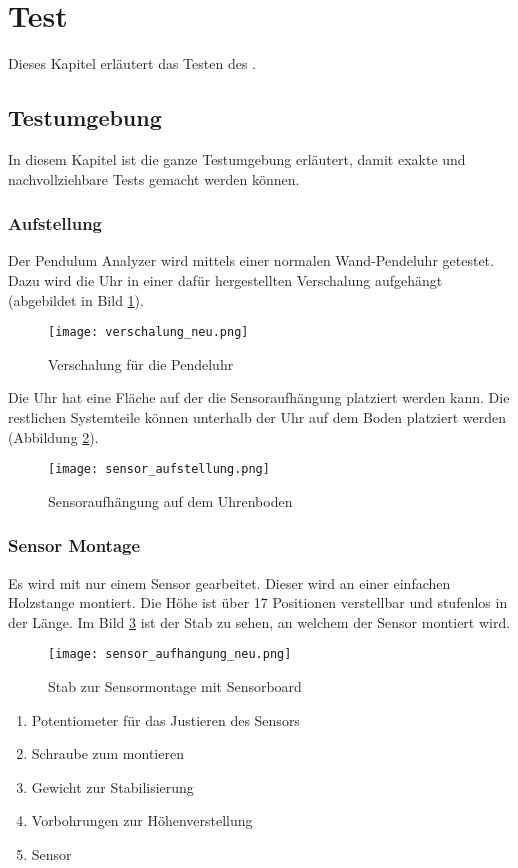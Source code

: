 \section{Test}
Dieses Kapitel erläutert das Testen des \documenttitle.
	\subsection{Testumgebung}
    In diesem Kapitel ist die ganze Testumgebung erläutert, damit exakte und nachvollziehbare Tests gemacht werden können.
    \subsubsection{Aufstellung}
    Der Pendulum Analyzer wird mittels einer normalen Wand-Pendeluhr getestet. Dazu wird die Uhr in einer dafür hergestellten Verschalung aufgehängt (abgebildet in Bild \ref{fig:verschalung}).
    \begin{figure}[H]
        \centering
        \texttt{[image: verschalung\_neu.png]}
        \caption{Verschalung für die Pendeluhr}
        \label{fig:verschalung}
    \end{figure}

    \noindent Die Uhr hat eine Fläche auf der die Sensoraufhängung platziert werden kann.
    Die restlichen Systemteile können unterhalb der Uhr auf dem Boden platziert werden (Abbildung \ref{fig:uhrboden}).
    \begin{figure}[h]
        \centering
        \texttt{[image: sensor\_aufstellung.png]}
        \caption{Sensoraufhängung auf dem Uhrenboden}
        \label{fig:uhrboden}
    \end{figure}
    
    \clearpage
    \subsubsection{Sensor Montage}
    Es wird mit nur einem Sensor gearbeitet.
    Dieser wird an einer einfachen Holzstange montiert.
    Die Höhe ist über 17 Positionen verstellbar und stufenlos in der Länge. Im Bild \ref{fig:sensor_montage} ist der Stab zu sehen, an welchem der Sensor montiert wird.
    \begin{figure}[H]
        \centering
        \texttt{[image: sensor\_aufhangung\_neu.png]}
        \caption{Stab zur Sensormontage mit Sensorboard}
        \label{fig:sensor_montage}
    \end{figure}
    \begin{enumerate}
        \item Potentiometer für das Justieren des Sensors
        \item Schraube zum montieren
        \item Gewicht zur Stabilisierung
        \item Vorbohrungen zur Höhenverstellung
        \item Sensor
    \end{enumerate}

